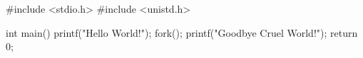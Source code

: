 \documentclass[varwidth=18em,crop]{standalone}
\begin{document}
\begin{ccode}
#include <stdio.h>
#include <unistd.h>

int main()
{
  printf("Hello World!\n");
  fork();
  printf("Goodbye Cruel World!\n");
  return 0;
}
\end{ccode}
\end{document}
